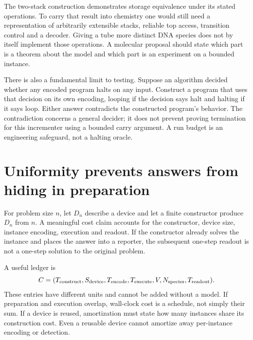 The two-stack construction demonstrates storage equivalence under its stated
operations. To carry that result into chemistry one would still need a
representation of arbitrarily extensible stacks, reliable top access,
transition control and a decoder. Giving a tube more distinct DNA species
does not by itself implement those operations. A molecular proposal should
state which part is a theorem about the model and which part is an
experiment on a bounded instance.

There is also a fundamental limit to testing. Suppose an algorithm decided
whether any encoded program halts on any input. Construct a program that
uses that decision on its own encoding, looping if the decision says halt
and halting if it says loop. Either answer contradicts the constructed
program's behavior. The contradiction concerns a general decider; it does
not prevent proving termination for this incrementer using a bounded carry
argument. A run budget is an engineering safeguard, not a halting oracle.

\section{Uniformity prevents answers from hiding in preparation}
For problem size $n$, let $D_n$ describe a device and let a finite constructor
produce $D_n$ from $n$. A meaningful cost claim accounts for the constructor,
device size, instance encoding, execution and readout. If the constructor
already solves the instance and places the answer into a reporter, the
subsequent one-step readout is not a one-step solution to the original problem.


A useful ledger is
\begin{equation}
 C=(T_{\rm construct},S_{\rm device},T_{\rm encode},
 T_{\rm execute},V,N_{\rm species},T_{\rm readout}).
\end{equation}
These entries have different units and cannot be added without a model.
If preparation and execution overlap, wall-clock cost is a schedule, not
simply their sum. If a device is reused, amortization must state how many
instances share its construction cost. Even a reusable device cannot
amortize away per-instance encoding or detection.

